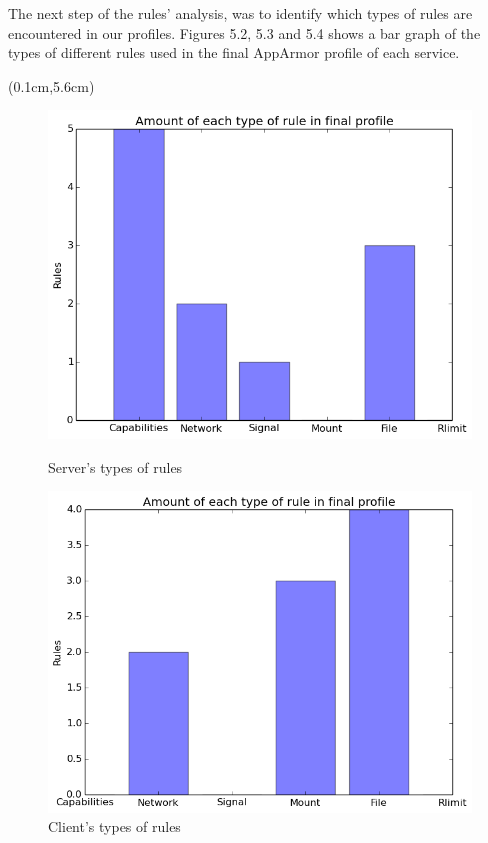 The next step of the rules' analysis, was to identify which types of rules are encountered in our profiles. Figures 5.2, 5.3 and 5.4 shows a bar graph of the types of different rules used in the final AppArmor profile of each service. 

\begin{textblock*}{18cm}(0.1cm,5.6cm) %
\begin{figure}
  \begin{minipage}[H!]{0.55\textwidth}
    \includegraphics[width=\textwidth]{./figures/mediastreaming/plots_with_grid/Barfinal_cloudsuitemedia-streamingserver.png}
    \caption{Server's types of rules}
  \end{minipage}
  \begin{minipage}[H!]{0.55\textwidth}
    \includegraphics[width=\textwidth]{./figures/mediastreaming/plots_with_grid/Barfinal_cloudsuitemedia-streamingclient.png}
    \caption{Client's types of rules}
  \end{minipage}
\end{figure}
\end{textblock*}

